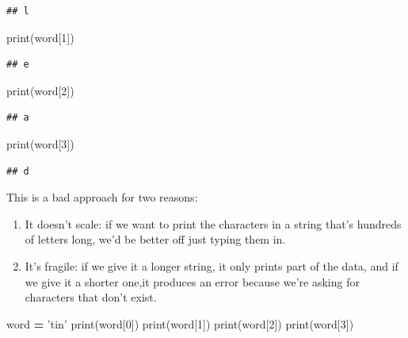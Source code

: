 \documentclass[]{book}
\newenvironment{Shaded}{\begin{snugshade}}{\end{snugshade}}
\newcommand{\BuiltInTok}[1]{#1}
\newcommand{\DecValTok}[1]{\textcolor[rgb]{0.00,0.00,0.81}{#1}}
\newcommand{\NormalTok}[1]{#1}
\newcommand{\OperatorTok}[1]{\textcolor[rgb]{0.81,0.36,0.00}{\textbf{#1}}}
\newcommand{\StringTok}[1]{\textcolor[rgb]{0.31,0.60,0.02}{#1}}
\providecommand{\tightlist}{%
  \setlength{\itemsep}{0pt}\setlength{\parskip}{0pt}}
\theoremstyle{definition}
\theoremstyle{definition}
\theoremstyle{definition}
\theoremstyle{remark}
\begin{document}
\begin{verbatim}
## l
\end{verbatim}

\begin{Shaded}
\begin{Highlighting}[]
\BuiltInTok{print}\NormalTok{(word[}\DecValTok{1}\NormalTok{])}
\end{Highlighting}
\end{Shaded}

\begin{verbatim}
## e
\end{verbatim}

\begin{Shaded}
\begin{Highlighting}[]
\BuiltInTok{print}\NormalTok{(word[}\DecValTok{2}\NormalTok{])}
\end{Highlighting}
\end{Shaded}

\begin{verbatim}
## a
\end{verbatim}

\begin{Shaded}
\begin{Highlighting}[]
\BuiltInTok{print}\NormalTok{(word[}\DecValTok{3}\NormalTok{])}
\end{Highlighting}
\end{Shaded}

\begin{verbatim}
## d
\end{verbatim}

This is a bad approach for two reasons:

\begin{enumerate}
\def\labelenumi{\arabic{enumi}.}
\tightlist
\item
  It doesn't scale: if we want to print the characters in a string
  that's hundreds of letters long, we'd be better off just typing them
  in.
\item
  It's fragile: if we give it a longer string, it only prints part of
  the data, and if we give it a shorter one,it produces an error because
  we're asking for characters that don't exist.
\end{enumerate}

\begin{Shaded}
\begin{Highlighting}[]
\NormalTok{word }\OperatorTok{=} \StringTok{'tin'}
\BuiltInTok{print}\NormalTok{(word[}\DecValTok{0}\NormalTok{])}
\BuiltInTok{print}\NormalTok{(word[}\DecValTok{1}\NormalTok{])}
\BuiltInTok{print}\NormalTok{(word[}\DecValTok{2}\NormalTok{])}
\BuiltInTok{print}\NormalTok{(word[}\DecValTok{3}\NormalTok{])}
\end{Highlighting}
\end{Shaded}
\end{document}
